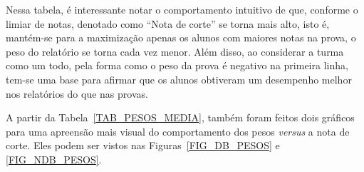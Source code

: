 \documentclass[11pt]{article}
\begin{document}
                Nessa tabela, é interessante notar o
                comportamento intuitivo de que, conforme o
                limiar de notas, denotado como ``Nota de
                corte'' se torna mais alto, isto é,
                mantém-se para a
                maximização apenas os alunos com maiores notas
                na prova, o peso do relatório se torna cada
                vez menor. Além disso, ao considerar
                a turma como um todo, pela
                forma como o peso da prova é negativo na
                primeira linha, tem-se uma base para afirmar
                que os alunos obtiveram um desempenho melhor
                nos relatórios do que nas provas.

                A partir da Tabela~\ref{TAB_PESOS_MEDIA},
                também foram feitos dois gráficos para uma
                apreensão mais visual do comportamento dos
                pesos \textit{versus} a nota de corte.
                Eles podem ser vistos nas
                Figuras~\ref{FIG_DB_PESOS} e
                \ref{FIG_NDB_PESOS}.
\end{document}
